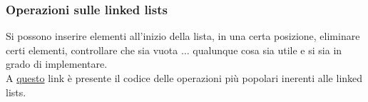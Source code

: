 \documentclass[12pt]{article}
\begin{document}
\subsubsection{Operazioni sulle linked lists}
\label{sssec:linked_lists_operations}
Si possono inserire elementi all'inizio della lista, in una certa posizione, eliminare certi elementi, controllare che sia vuota $\dots$ qualunque cosa sia utile e si sia in grado di implementare.
\\
A \textcolor{blue}{\href{https://github.com/andrea-malvezzi/unibo/tree/master/ANDREA/Programmazione/Appunti/codice/Puntatori_Strutture_Dinamiche}{questo}} link è presente il codice delle operazioni più popolari inerenti alle linked lists.
\end{document}

